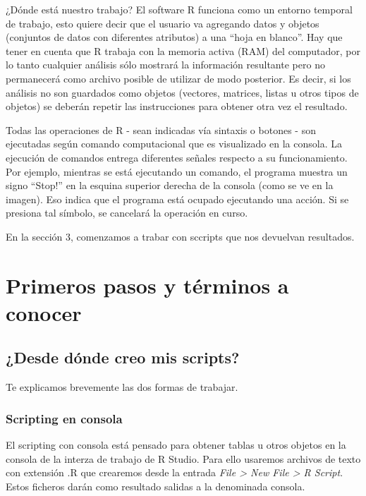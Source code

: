 \documentclass[
]{book}
\begin{document}
¿Dónde está nuestro trabajo? El software R funciona como un entorno temporal de trabajo, esto quiere decir que el usuario va agregando datos y objetos (conjuntos de datos con diferentes atributos) a una ``hoja en blanco''. Hay que tener en cuenta que R trabaja con la memoria activa (RAM) del computador, por lo tanto cualquier análisis sólo mostrará la información resultante pero no permanecerá como archivo posible de utilizar de modo posterior. Es decir, si los análisis no son guardados como objetos (vectores, matrices, listas u otros tipos de objetos) se deberán repetir las instrucciones para obtener otra vez el resultado.

Todas las operaciones de R - sean indicadas vía sintaxis o botones - son ejecutadas según comando computacional que es visualizado en la consola. La ejecución de comandos entrega diferentes señales respecto a su funcionamiento. Por ejemplo, mientras se está ejecutando un comando, el programa muestra un signo ``Stop!'' en la esquina superior derecha de la consola (como se ve en la imagen). Eso indica que el programa está ocupado ejecutando una acción. Si se presiona tal símbolo, se cancelará la operación en curso.

En la sección 3, comenzamos a trabar con sccripts que nos devuelvan resultados.

\hypertarget{tse02}{%
\chapter{Primeros pasos y términos a conocer}\label{tse02}}

\hypertarget{desde-duxf3nde-creo-mis-scripts}{%
\section{¿Desde dónde creo mis scripts?}\label{desde-duxf3nde-creo-mis-scripts}}

Te explicamos brevemente las dos formas de trabajar.

\hypertarget{scripting-en-consola}{%
\subsection{Scripting en consola}\label{scripting-en-consola}}

El scripting con consola está pensado para obtener tablas u otros objetos en la consola de la interza de trabajo de R Studio. Para ello usaremos archivos de texto con extensión .R que crearemos desde la entrada \emph{File \textgreater{} New File \textgreater{} R Script}. Estos ficheros darán como resultado salidas a la denominada consola.
\end{document}
